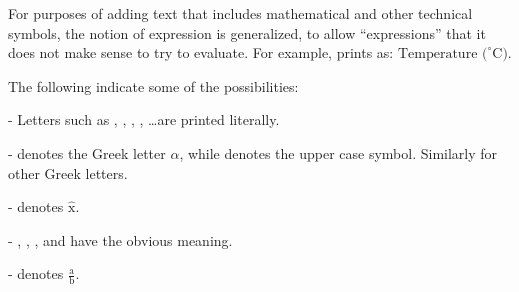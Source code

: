 For purposes of adding text that includes mathematical and other
technical symbols, the notion of expression is generalized, to allow
``expressions'' that it does not make sense to try to evaluate. For
example,  prints as:
$\mbox{Temperature (}^{\circ}\mbox{C)}$.

The following indicate some of the possibilities:
\begin{itemizz}
  \item[-] Letters such as , , , ,
    \ldots are printed literally.
  \item[-]  denotes the Greek letter $\alpha$, while
     denotes the upper case symbol.  Similarly for
    other Greek letters.
  \item[-]  denotes $\hat{\mbox{x}}$.
  \item[-] , , ,
    and  have the obvious meaning.
  \item[-]  denotes $\frac{\mbox{a}}{\mbox{b}}$.
 \end{itemizz}

